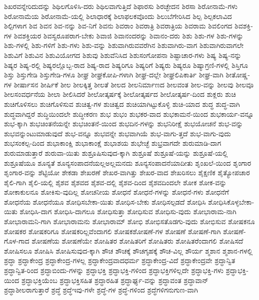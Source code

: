 {ಶಿಖರವನ್ನೇರಿದುದನ್ನು
ಶಿಥಿಲಗೊಳಿಸಿ-ದರು
ಶಿಥಿಲವಾಗುತ್ತಿದೆ
ಶಿಫಾರಸು
ಶಿರಚ್ಛೇದನ
ಶಿರಸಾ
ಶಿರೋನಾಮೆ-ಗಳು
ಶಿರೋನಾಮೆಯ
ಶಿರೋನಾಮೆ-ಯಲ್ಲಿ
ಶಿಲಾಧಾರಕ್ಕೆ
ಶಿಲಾಫಲಕವೊಂದು
ಶಿಲುಬೆಗೇರಿಸಿದ
ಶಿಲ್ಪ
ಶಿಲ್ಪಕಲಾವಿದ
ಶಿಲ್ಪಿಗಳಾಗ
ಶಿವ
ಶಿವನ
ಶಿವ-ನನ್ನು
ಶಿವ-ನಿಗೆ
ಶಿವನು
ಶಿವರಾಂ
ಶಿವರಾತ್ರಿ
ಶಿವರಾತ್ರಿಯ
ಶಿವರಾಮ
ಶಿವಲಿಂಗದ
ಶಿವಶಕ್ತಿ-ಗಳ
ಶಿವಶಕ್ತಿಯರ
ಶಿವಸ್ವರೂಪರಾಗ-ಬೇಕು
ಶಿವಾಜಿ
ಶಿವಾನಂದರನ್ನು
ಶಿವಾನಂ-ದರು
ಶಿಶು
ಶಿಶು-ಗಳ
ಶಿಶು-ಗಳನ್ನು
ಶಿಶು-ಗಳಲ್ಲಿ
ಶಿಶು-ಗಳಿಗೆ
ಶಿಶು-ಗಳು
ಶಿಶು-ವನ್ನು
ಶಿಶುವಾಗಿರುವವರೆಗಿನ
ಶಿಶುವಾಗಿರು-ವಾಗ
ಶಿಶುವಾಗಿರುವಾಗಲೇ
ಶಿಶುವಿಗೆ
ಶಿಶುವಿನ
ಶಿಶುವಿಯೋಗದ
ಶಿಶುವು
ಶಿಶುವೆನಿಸಿದ
ಶಿಶುಸಂಗೋಪನಾ
ಶಿಷ್ಟಾಚಾರ-ಗಳು
ಶಿಷ್ಯ
ಶಿಷ್ಯ-ನನ್ನು
ಶಿಷ್ಯರ
ಶಿಷ್ಯ-ರಲ್ಲಿ
ಶಿಷ್ಯರಲ್ಲೊಬ್ಬ-ರಾದ
ಶಿಷ್ಯ-ರಾದ
ಶಿಷ್ಯರಿಗೂ
ಶಿಷ್ಯರಿಗೆ
ಶಿಷ್ಯರು
ಶಿಷ್ಯರೂ
ಶಿಷ್ಯಾಗ್ರಣಿ-ಗಳಲ್ಲಿ
ಶಿಸ್ತಿಗೂ
ಶಿಸ್ತು
ಶಿಸ್ತುಗೇಡಿ
ಶಿಸ್ತುಗೇಡಿ-ಗಳೂ
ಶೀಘ್ರ
ಶೀಘ್ರಕೋಪಿ-ಗಳಾಗಿ
ಶೀಘ್ರ-ದಲ್ಲೇ
ಶೀಘ್ರಲಿಪಿಕಾರ್ತಿ
ಶೀಘ್ರ-ವಾಗಿ
ಶೀತೋಷ್ಣ-ಗಳ
ಶೀರ್ಷಾಸನ
ಶೀರ್ಷಿಕೆ
ಶೀಲ
ಶೀಲಕ್ಕಿತ್ತ
ಶೀಲತೆ
ಶೀಲದ
ಶೀಲನಿರ್ಮಾಣದ
ಶೀಲವಂತ
ಶೀಲ-ವನ್ನು
ಶೀಲವು
ಶೀಲವೂ
ಶೀಲಸಂವರ್ಧನೆಯ
ಶೀಲಾ
ಶೀಲಿಸಿದರೆ
ಶೀಲೋತ್ಕರ್ಷಕ್ಕೆ
ಶೀಲೋತ್ಕರ್ಷದ
ಶೀಲೋತ್ಕರ್ಷ-ದಿಂದ
ಶುಕ್ಲರು
ಶುಚಿ
ಶುಚಿಗೊಳಿಸಲು
ಶುಚಿಗೊಳಿಸುವ
ಶುಚಿತ್ವ-ಗಳ
ಶುಚಿತ್ವದ
ಶುಚಿಯಾಗಿಟ್ಟುಕೊಳ್ಳಿ
ಶುಚಿ-ಯಾದ
ಶುದ್ಧ
ಶುದ್ಧ-ವಾಗಿ
ಶುದ್ಧವಾಗಿದ್ದರೆ
ಶುದ್ಧಿಯಿಂದಲೇ
ಶುದ್ಧೀಕರಣ
ಶುಭ
ಶುಭಂ
ಶುಭಕರ-ವಾದ
ಶುಭಕಾಮನೆ-ಯಿಂದ
ಶುಭಕಾರ್ಯ-ವನ್ನೂ
ಶುಭ-ಕ್ಕಾಗಿ
ಶುಭಚಿಂತನೆಯನ್ನೇ
ಶುಭಚಿಂತನೆ-ಯಿಂದ
ಶುಭದಿನ-ಗಳನ್ನು
ಶುಭನಿರೀಕ್ಷೆ
ಶುಭಯೋಚನೆ
ಶುಭ-ವನ್ನು
ಶುಭವನ್ನುಂಟುಮಾಡುವುದೆ
ಶುಭ-ವನ್ನೂ
ಶುಭವನ್ನೇ
ಶುಭವಾಗಿಯೆ
ಶುಭ-ವಾಗು-ತ್ತದೆ
ಶುಭ-ವಾಗು-ವುದು
ಶುಭಸಂಕಲ್ಪ-ದಿಂದ
ಶುಭಾಕಾಂಕ್ಷಿ
ಶುಭಾಕಾಂಕ್ಷೆ
ಶುಭಾಶಯ
ಶುಭೇಚ್ಛೆ
ಶುಭ್ರವಾಗದೇ
ಶುರುಮಾಡಿ-ದಾಗ
ಶುರುಮಾಡುತ್ತಾರೆ
ಶುರುವಾ-ಯಿತು
ಶುಶ್ರೂಷಿಸುವುದ-ಕ್ಕಾಗಿ
ಶುಶ್ರೂಷೆ
ಶುಶ್ರೂಷೆ-ಯನ್ನು
ಶುಶ್ರೂಷೆ-ಯಲ್ಲಿ
ಶುಶ್ರೂಷೆಯೂ
ಶೂನ್ಯತೆ
ಶೂನ್ಯಸಂಪಾದನೆಯಲ್ಲಅಲ್ಲಮನದು
ಶೂನ್ಯಸಂಪಾದನೆಯಾದೀತು
ಶೃಂಖಲೆ-ಯಿಂದ
ಶೃಂಗಾರ
ಶೃಂಗಾರ-ವನ್ನು
ಶೆಟ್ಟಿಯೋ
ಶೇಕಡಾ
ಶೇಖರಣೆ
ಶೇಖರ-ವಾಗಿತ್ತು
ಶೇಖರ-ವಾದ
ಶೇಖರಿಸಲು
ಶೈಕ್ಷಣಿಕ
ಶೈತ್ಯೋಪಚಾರ
ಶೈಲಿ-ಗಾಗಿ
ಶೈಲಿ-ಯಲ್ಲಿ
ಶೈಶವ
ಶೈಶವದ
ಶೈಶವ-ದಲ್ಲಿ
ಶೈಶವ-ದಿಂದ
ಶೈಶವದಿಂದಲೇ
ಶೋಕ
ಶೋಕ-ವನ್ನು
ಶೋಕಾಕುಲನೂ
ಶೋಕಿಸು-ವುದಿಲ್ಲ
ಶೋಚನೀಯ
ಶೋಧನೆ
ಶೋಧನೆ-ಗಳನ್ನು
ಶೋಧನೆ-ಗಳು
ಶೋಧನೆಗೆ
ಶೋಧನೆಯ
ಶೋಧನೆಯೂ
ಶೋಧಿಸಬೇಕಾ-ಯಿತು
ಶೋಧಿಸ-ಬೇಕು
ಶೋಧಿಸಲ್ಪಡದೆ
ಶೋಧಿಸಿ
ಶೋಧಿಸಿಕೊಳ್ಳಬೇಕಾ-ಯಿತು
ಶೋಧಿಸಿ-ದಾಗ
ಶೋಧಿಸಿ-ದಾಗಲೂ
ಶೋಧಿಸುತ್ತಾ
ಶೋಧಿಸುವ
ಶೋಧಿಸು-ವುದು
ಶೋಭಾರಾಮ-ನಾಗಿ
ಶೋಭಾರಾಮನಿ-ಗಾಗಿ
ಶೋಭಾರಾಮನು
ಶೋಭಾರಾಮ್
ಶೋಭಿ
ಶೋಭಿಸತೊಡಗು-ವುದು
ಶೋಭಿಸುವ
ಶೋಷಕನೂ
ಶೋಷಕರ
ಶೋಷಕರಿಗೂ
ಶೋಷಕರಿಲ್ಲವೆಂದಾಗಲಿ
ಶೋಷಕಶೋಷಣೆ-ಗಳ
ಶೋಷಣೆ
ಶೋಷಣೆ-ಗಾಗಿ
ಶೋಷಣೆ-ಗೊಳ-ಗಾದ
ಶೋಷಣೆಯ
ಶೋಷಣೆಯೇ
ಶೋಷಿತರ
ಶೋಷಿತರಿಗೆ
ಶೋಷಿತರು
ಶೋಷಿತರೆಂದಾಗಲಿ
ಶೋಷಿಸದೆ
ಶೋಷಿಸಲೂ
ಶೋಷಿಸಿ
ಶೋಷಿಸುವುದ-ಕ್ಕಾಗಿ
ಶೌಚ
ಶೌಚಕ್ಕೆ
ಶೌಚಗೃಹಕ್ಕೆ
ಶೌಚ-ವಿಲ್ಲ
ಶೌರ್ಯ
ಶ್ಮಶಾನ
ಶ್ಮಶಾನ-ಗಳಲ್ಲಿ
ಶ್ರದ್ಧಾ
ಶ್ರದ್ಧಾಕೇಂದ್ರ
ಶ್ರದ್ಧಾಕೇಂದ್ರ-ಗಳಲ್ಲ
ಶ್ರದ್ಧಾಕೇಂದ್ರವಾದಧರ್ಮ
ಶ್ರದ್ಧಾಕೇಂದ್ರ-ವಿದೆ
ಶ್ರದ್ಧಾಕೇಂದ್ರವೇ
ಶ್ರದ್ಧಾನ್ವಿತ
ಶ್ರದ್ಧಾನ್ವಿತ-ರಿಂದ
ಶ್ರದ್ಧಾಬಿಂದು-ಗಳನ್ನು
ಶ್ರದ್ಧಾಭಕ್ತಿ
ಶ್ರದ್ಧಾಭಕ್ತಿ-ಗಳಿಂದ
ಶ್ರದ್ಧಾಭಕ್ತಿಗಳಿಲ್ಲದೇ
ಶ್ರದ್ಧಾಭಕ್ತಿ-ಗಳು
ಶ್ರದ್ಧಾಭಕ್ತಿ-ಯಿಂದ
ಶ್ರದ್ಧಾಭಕ್ತಿಯೆಂಬ
ಶ್ರದ್ಧಾಭಕ್ತಿಸಹಿತ
ಶ್ರದ್ಧಾರಹಿತ
ಶ್ರದ್ಧಾರ್ಘ್ಯ-ವನ್ನು
ಶ್ರದ್ಧಾವಂತ
ಶ್ರದ್ಧಾವಾನ್
ಶ್ರದ್ಧಾಶೀಲರಾಗುತ್ತಾರೆ
ಶ್ರದ್ಧೆ
ಶ್ರದ್ಧೆಇವು-ಗಳೇ
ಶ್ರದ್ಧೆ-ಗಳ
ಶ್ರದ್ಧೆ-ಗಳಿಂದ
ಶ್ರದ್ಧೆಗಳಿಗನುಗುಣ-ವಾಗಿ
}
